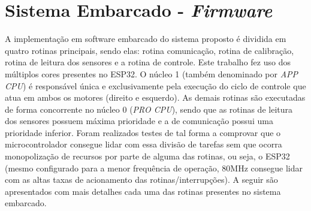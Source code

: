 \section{Sistema Embarcado - \emph{Firmware}}
\label{sec:sistema_embarcado}

A implementação em software embarcado do sistema proposto é dividida em quatro rotinas principais, sendo elas: rotina comunicação, rotina de calibração, rotina de leitura dos sensores  e a rotina de controle. 
Este trabalho fez uso dos múltiplos cores presentes no ESP32. 
O núcleo 1 (também denominado por \emph{APP CPU}) é responsável única e
exclusivamente  pela execução do ciclo de controle que atua em ambos os motores (direito e esquerdo). 
As demais rotinas são executadas de forma concorrente no núcleo 0 (\emph{PRO CPU}), sendo que as rotinas de leitura dos sensores possuem máxima prioridade e a de comunicação possui uma prioridade inferior. Foram realizados testes de tal forma a comprovar que o microcontrolador consegue lidar com essa 
divisão de tarefas sem que ocorra monopolização de recursos por parte de alguma das rotinas, ou seja, o ESP32 (mesmo configurado para a menor frequência de operação, 80MHz consegue lidar com as altas taxas de acionamento das rotinas/interrupções). A seguir são apresentados com mais detalhes cada uma das rotinas presentes no 
sistema embarcado.




